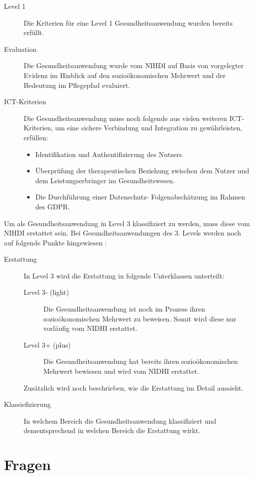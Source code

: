 \documentclass{article}
\begin{document}
			\begin{description}
				\item[Level 1] Die Kriterien für eine Level 1 Gesundheitsanwendung wurden bereits erfüllt.
				\item[Evaluation] Die Gesundheitsanwendung wurde vom NIHDI auf Basis von vorgelegter Evidenz im Hinblick auf den sozioökonomischen Mehrwert und der Bedeutung im Pflegepfad evaluiert. 
				\item[ICT-Kriterien] Die Gesundheitsanwendung muss noch folgende aus vielen weiteren ICT-Kriterien, um eine sichere Verbindung und Integration zu gewährleisten, erfüllen:
					\begin{itemize}
						\item Identifikation und Authentifizierung des Nutzers.
						\item Überprüfung der therapeutischen Beziehung zwischen dem Nutzer und dem Leistungserbringer im Gesundheitswesen.
						\item Die Durchführung einer Datenschutz- Folgenabschätzung im Rahmen des GDPR.
					\end{itemize}
			\end{description}
			Um als Gesundheitsanwendung in Level 3 klassifiziert zu werden, muss diese vom NIHDI erstattet sein. Bei Gesundheitsanwendungen des 3. Levels werden noch auf folgende Punkte hingewiesen \cite{belgien-pyramide}:
			\begin{description}
				\item[Erstattung] In Level 3 wird die Erstattung in folgende Unterklassen unterteilt:
					\begin{description}
						\item[Level 3- (light)] Die Gesundheitsanwendung ist noch im Prozess ihren sozioökonomischen Mehrwert zu beweisen. Somit wird diese nur vorläufig vom NIDHI erstattet.
						\item[Level 3+ (plus)] Die Gesundheitsanwendung hat bereits ihren sozioökonomischen Mehrwert bewiesen und wird vom NIDHI erstattet.
					\end{description}
				Zusätzlich wird noch beschrieben, wie die Erstattung im Detail aussieht.
				\item[Klassiefizierung] In welchem Bereich die Gesundheitsanwendung klassifiziert und dementsprechend in welchen Bereich die Erstattung wirkt. 
			\end{description} 
			
			\newpage		
	\section{Fragen}
\end{document}
